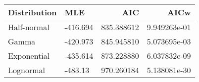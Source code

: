 \begin{tabular}{llrr}
\toprule
Distribution &      MLE &         AIC &          AICw \\
\midrule
 Half-normal & -416.694 &  835.388612 &  9.949263e-01 \\
       Gamma & -420.973 &  845.945810 &  5.073695e-03 \\
 Exponential & -435.614 &  873.228880 &  6.037832e-09 \\
   Lognormal &  -483.13 &  970.260184 &  5.138081e-30 \\
\bottomrule
\end{tabular}
